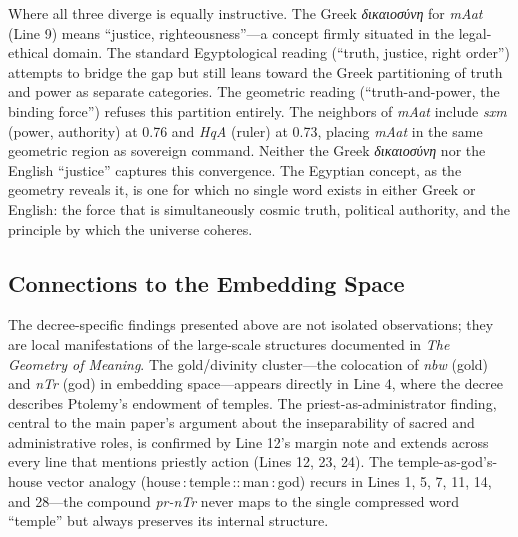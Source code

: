 \documentclass[11pt, a4paper]{article}
\newcommand{\gk}[1]{{\greekfont\itshape #1}}
\begin{document}
Where all three diverge is equally instructive. The Greek \gk{δικαιοσύνη} for \textit{mAat} (Line 9) means ``justice, righteousness''---a concept firmly situated in the legal-ethical domain. The standard Egyptological reading (``truth, justice, right order'') attempts to bridge the gap but still leans toward the Greek partitioning of truth and power as separate categories. The geometric reading (``truth-and-power, the binding force'') refuses this partition entirely. The neighbors of \textit{mAat} include \textit{sxm} (power, authority) at 0.76 and \textit{HqA} (ruler) at 0.73, placing \textit{mAat} in the same geometric region as sovereign command. Neither the Greek \gk{δικαιοσύνη} nor the English ``justice'' captures this convergence. The Egyptian concept, as the geometry reveals it, is one for which no single word exists in either Greek or English: the force that is simultaneously cosmic truth, political authority, and the principle by which the universe coheres.

\subsection{Connections to the Embedding Space}

The decree-specific findings presented above are not isolated observations; they are local manifestations of the large-scale structures documented in \textit{The Geometry of Meaning}. The gold/divinity cluster---the colocation of \textit{nbw} (gold) and \textit{nTr} (god) in embedding space---appears directly in Line 4, where the decree describes Ptolemy's endowment of temples. The priest-as-administrator finding, central to the main paper's argument about the inseparability of sacred and administrative roles, is confirmed by Line 12's margin note and extends across every line that mentions priestly action (Lines 12, 23, 24). The temple-as-god's-house vector analogy (house\,:\,temple\,::\,man\,:\,god) recurs in Lines 1, 5, 7, 11, 14, and 28---the compound \textit{pr-nTr} never maps to the single compressed word ``temple'' but always preserves its internal structure.
\end{document}

